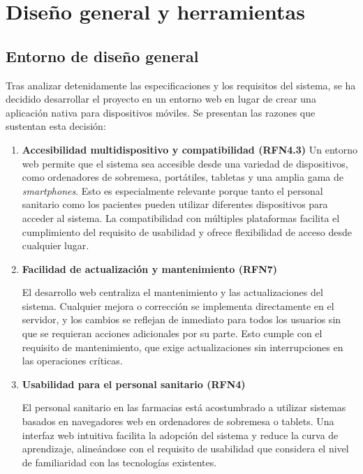 \chapter{Diseño general y herramientas}


\section{Entorno de diseño general}
Tras analizar detenidamente las especificaciones y los requisitos del sistema, se ha decidido desarrollar el proyecto en un entorno web en lugar de crear una aplicación nativa para dispositivos móviles. Se presentan las razones que sustentan esta decisión:

\begin{enumerate} 
	\item \textbf{Accesibilidad multidispositivo y compatibilidad (RFN4.3)}
	Un entorno web permite que el sistema sea accesible desde una variedad de dispositivos, como ordenadores de sobremesa, portátiles, tabletas y una amplia gama de \textit{smartphones}. Esto es especialmente relevante porque tanto el personal sanitario como los pacientes pueden utilizar diferentes dispositivos para acceder al sistema. La compatibilidad con múltiples plataformas facilita el cumplimiento del requisito de usabilidad y ofrece flexibilidad de acceso desde cualquier lugar.
	
	\item \textbf{Facilidad de actualización y mantenimiento (RFN7)}
	
	El desarrollo web centraliza el mantenimiento y las actualizaciones del sistema. Cualquier mejora o corrección se implementa directamente en el servidor, y los cambios se reflejan de inmediato para todos los usuarios sin que se requieran acciones adicionales por su parte. Esto cumple con el requisito de mantenimiento, que exige actualizaciones sin interrupciones en las operaciones críticas.
	
	\item \textbf{Usabilidad para el personal sanitario (RFN4)}
	
	El personal sanitario en las farmacias está acostumbrado a utilizar sistemas basados en navegadores web en ordenadores de sobremesa o tablets. Una interfaz web intuitiva facilita la adopción del sistema y reduce la curva de aprendizaje, alineándose con el requisito de usabilidad que considera el nivel de familiaridad con las tecnologías existentes.
	

\end{enumerate}
